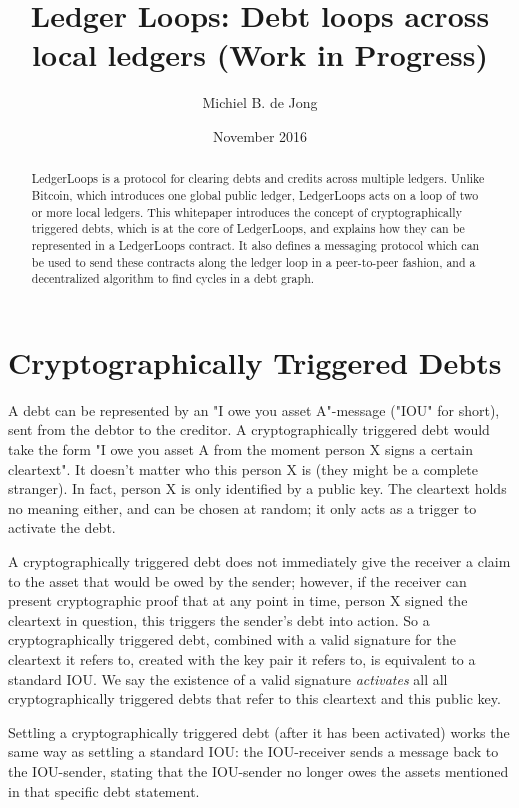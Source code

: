\documentclass[11pt,twoside,a4paper]{article}
\begin{document}
\title{Ledger Loops: Debt loops across local ledgers (Work in Progress)}
\author{Michiel B. de Jong}
\date{November 2016}
\maketitle
\begin{abstract}
LedgerLoops is a protocol for clearing debts and credits across multiple ledgers. Unlike Bitcoin, which introduces one global public ledger, LedgerLoops acts on a loop of two or more local ledgers.
This whitepaper introduces the concept of cryptographically triggered debts, which is at the core of LedgerLoops, and explains how they can be represented in a LedgerLoops contract. It also defines a messaging protocol which can be used to send these contracts along the ledger loop in a peer-to-peer fashion, and a decentralized algorithm to find cycles in a debt graph.
\end{abstract}
\section{Cryptographically Triggered Debts}
A debt can be represented by an "I owe you asset A"-message ("IOU" for short), sent from the debtor to the creditor.
A cryptographically triggered debt would take the form "I owe you asset A from the moment person X signs a certain cleartext".
It doesn't matter who this person X is (they might be a complete stranger). In fact, person X is only identified by a public key. The cleartext holds no meaning either, and can be chosen at random; it only acts as a trigger to activate the debt.

A cryptographically triggered debt does not immediately give the receiver a claim to the asset that would be owed by the sender; however, if the receiver can present cryptographic proof that at any point in time,
person X signed the cleartext in question, this triggers the sender's debt into action.
So a cryptographically triggered debt, combined with a valid signature for the cleartext it refers to, created with the key pair it refers to, is equivalent to a standard IOU.
We say the existence of a valid signature {\em activates} all all cryptographically triggered debts that refer to this cleartext and this public key.

Settling a cryptographically triggered debt (after it has been activated) works the same way as settling
a standard IOU: the IOU-receiver sends a message back to the IOU-sender, stating that the IOU-sender no longer owes
the assets mentioned in that specific debt statement.
\end{document}
